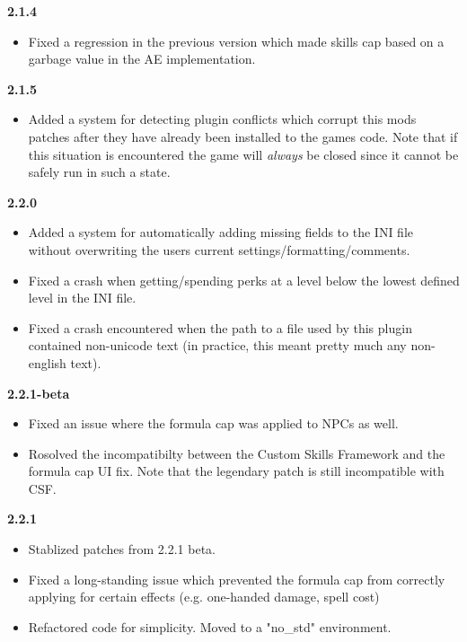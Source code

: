 \documentclass[12pt]{amsart}
\begin{document}
\startblock
\noindent
\textbf{2.1.4}
\begin{itemize}
    \item Fixed a regression in the previous version which made skills cap based
          on a garbage value in the AE implementation.
\end{itemize}
\stopblock

\startblock
\noindent
\textbf{2.1.5}
\begin{itemize}
    \item Added a system for detecting plugin conflicts which corrupt this mods
          patches after they have already been installed to the games code. Note
          that if this situation is encountered the game will \emph{always} be
          closed since it cannot be safely run in such a state.
\end{itemize}
\stopblock

\startblock
\noindent
\textbf{2.2.0}
\begin{itemize}
    \item Added a system for automatically adding missing fields to the INI file
          without overwriting the users current settings/formatting/comments.
    \item Fixed a crash when getting/spending perks at a level below the lowest
          defined level in the INI file.
    \item Fixed a crash encountered when the path to a file used by this plugin
          contained non-unicode text (in practice, this meant pretty much any
          non-english text).
\end{itemize}
\stopblock

\startblock
\noindent
\textbf{2.2.1-beta}
\begin{itemize}
    \item Fixed an issue where the formula cap was applied to NPCs as well.
    \item Rosolved the incompatibilty between the Custom Skills Framework and
          the formula cap UI fix. Note that the legendary patch is still
          incompatible with CSF.
\end{itemize}
\stopblock

\startblock
\noindent
\textbf{2.2.1}
\begin{itemize}
    \item Stablized patches from 2.2.1 beta.
    \item Fixed a long-standing issue which prevented the formula cap from
          correctly applying for certain effects (e.g. one-handed damage,
          spell cost)
    \item Refactored code for simplicity. Moved to a "no\_std" environment.
\end{itemize}
\stopblock
\end{document}
